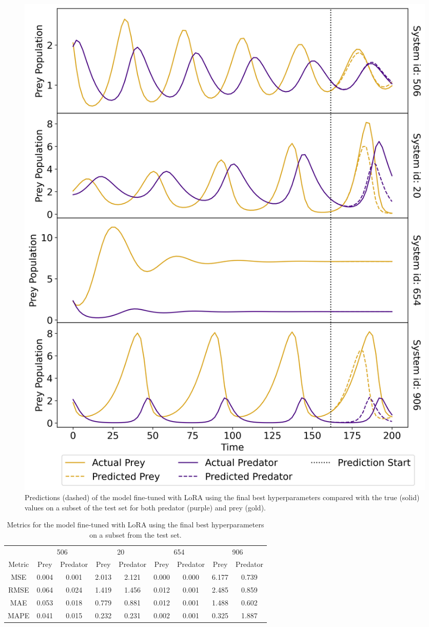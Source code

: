 \documentclass[11pt,a4paper]{article}
\begin{document}
\begin{figure}
    \centering
    \includegraphics[width=\columnwidth, keepaspectratio]{../plots/predictions_lora_final.png}
    \caption{Predictions (dashed) of the model fine-tuned with LoRA using the final best hyperparameters compared with the true (solid) values on a subset of the test set for both predator (purple) and prey (gold).}\label{fig:lora_final_pred}
\end{figure}

\begin{table}
    \centering
    \begin{tabular}{c|c|c|c|c|c|c|c|c}
        & \multicolumn{2}{c|}{506} & \multicolumn{2}{c|}{20} & \multicolumn{2}{c|}{654} & \multicolumn{2}{|c}{906} \\
        Metric & Prey & Predator & Prey & Predator & Prey & Predator & Prey & Predator \\
        \hline
        MSE & 0.004 & 0.001 & 2.013 & 2.121 & 0.000 & 0.000 & 6.177 & 0.739 \\
        RMSE & 0.064 & 0.024 & 1.419 & 1.456 & 0.012 & 0.001 & 2.485 & 0.859 \\
        MAE & 0.053 & 0.018 & 0.779 & 0.881 & 0.012 & 0.001 & 1.488 & 0.602 \\
        MAPE & 0.041 & 0.015 & 0.232 & 0.231 & 0.002 & 0.001 & 0.325 & 1.887 \\    
    \end{tabular}
    \caption{Metrics for the model fine-tuned with LoRA using the final best hyperparameters on a subset from the test set.}
    \label{tab:lora_final_metrics}
\end{table}
\end{document}
